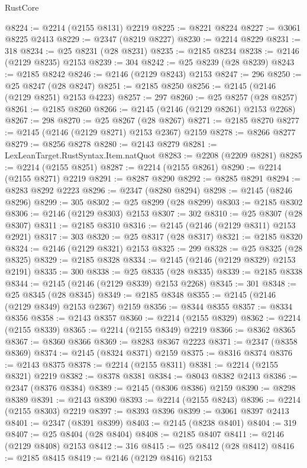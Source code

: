 \begin{lexlean}{RustCore}
\begin{coremodule}
@8224 := @2214 (@2155 @8131) @2219
@8225 := @8221 @8224
@8227 := @3061 @8225 @2413
@8229 := @2347 (@8219 @8227)
@8230 := @2214 @8229
@8231 := 318
@8234 := @25 @8231 (@28 @8231)
@8235 := @2185 @8234
@8238 := @2146 (@2129 @8235) @2153
@8239 := 304
@8242 := @25 @8239 (@28 @8239)
@8243 := @2185 @8242
@8246 := @2146 (@2129 @8243) @2153
@8247 := 296
@8250 := @25 @8247 (@28 @8247)
@8251 := @2185 @8250
@8256 := @2145 (@2146 (@2129 @8251) @2153 @4223)
@8257 := 297
@8260 := @25 @8257 (@28 @8257)
@8261 := @2185 @8260
@8266 := @2145 (@2146 (@2129 @8261) @2153 @2268)
@8267 := 298
@8270 := @25 @8267 (@28 @8267)
@8271 := @2185 @8270
@8277 := @2145 (@2146 (@2129 @8271) @2153 @2367) @2159
@8278 := @8266 @8277
@8279 := @8256 @8278
@8280 := @2143 @8279
@8281 := LexLeanTarget.RustSyntax.Item.natQuot
@8283 := @2208 (@2209 @8281)
@8285 := @2214 (@2155 @8251)
@8287 := @2214 (@2155 @8261)
@8290 := @2214 (@2155 @8271) @2219
@8291 := @8287 @8290
@8292 := @8285 @8291
@8294 := @8283 @8292 @2223
@8296 := @2347 (@8280 @8294)
@8298 := @2145 (@8246 @8296)
@8299 := 305
@8302 := @25 @8299 (@28 @8299)
@8303 := @2185 @8302
@8306 := @2146 (@2129 @8303) @2153
@8307 := 302
@8310 := @25 @8307 (@28 @8307)
@8311 := @2185 @8310
@8316 := @2145 (@2146 (@2129 @8311) @2153 @2921)
@8317 := 303
@8320 := @25 @8317 (@28 @8317)
@8321 := @2185 @8320
@8324 := @2146 (@2129 @8321) @2153
@8325 := 299
@8328 := @25 @8325 (@28 @8325)
@8329 := @2185 @8328
@8334 := @2145 (@2146 (@2129 @8329) @2153 @2191)
@8335 := 300
@8338 := @25 @8335 (@28 @8335)
@8339 := @2185 @8338
@8344 := @2145 (@2146 (@2129 @8339) @2153 @2268)
@8345 := 301
@8348 := @25 @8345 (@28 @8345)
@8349 := @2185 @8348
@8355 := @2145 (@2146 (@2129 @8349) @2153 @2367) @2159
@8356 := @8344 @8355
@8357 := @8334 @8356
@8358 := @2143 @8357
@8360 := @2214 (@2155 @8329)
@8362 := @2214 (@2155 @8339)
@8365 := @2214 (@2155 @8349) @2219
@8366 := @8362 @8365
@8367 := @8360 @8366
@8369 := @8283 @8367 @2223
@8371 := @2347 (@8358 @8369)
@8374 := @2145 (@8324 @8371) @2159
@8375 := @8316 @8374
@8376 := @2143 @8375
@8378 := @2214 (@2155 @8311)
@8381 := @2214 (@2155 @8321) @2219
@8382 := @8378 @8381
@8384 := @8043 @8382 @2413
@8386 := @2347 (@8376 @8384)
@8389 := @2145 (@8306 @8386) @2159
@8390 := @8298 @8389
@8391 := @2143 @8390
@8393 := @2214 (@2155 @8243)
@8396 := @2214 (@2155 @8303) @2219
@8397 := @8393 @8396
@8399 := @3061 @8397 @2413
@8401 := @2347 (@8391 @8399)
@8403 := @2145 (@8238 @8401)
@8404 := 319
@8407 := @25 @8404 (@28 @8404)
@8408 := @2185 @8407
@8411 := @2146 (@2129 @8408) @2153
@8412 := 316
@8415 := @25 @8412 (@28 @8412)
@8416 := @2185 @8415
@8419 := @2146 (@2129 @8416) @2153

\end{coremodule}
\end{lexlean}
